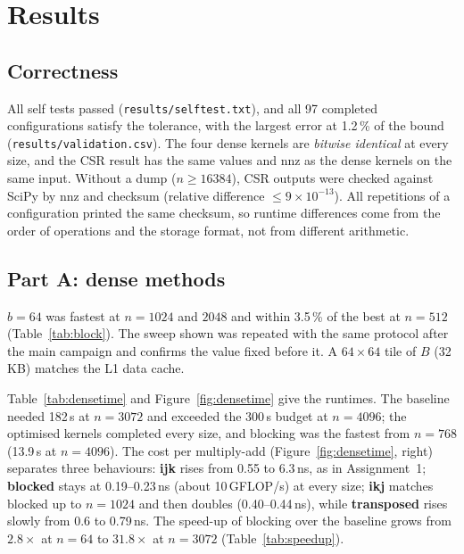 \documentclass[11pt,a4paper]{article}
\newcommand{\concept}[1]{\par\addvspace{8pt}\Needspace{5\baselineskip}%
  \noindent{\color{accent}\bfseries\boldmath #1}\par\nopagebreak\vspace{2pt}}
\begin{document}
\section{Results}

\FloatBarrier
\subsection{Correctness}
All self tests passed (\texttt{results/selftest.txt}), and all 97 completed configurations satisfy
the tolerance, with the largest error at 1.2\,\% of the bound (\texttt{results/validation.csv}).
The four dense kernels are \emph{bitwise identical} at every size, and the CSR result has the same
values and nnz as the dense kernels on the same input. Without a dump ($n\ge16384$), CSR outputs
were checked against SciPy by nnz and checksum (relative difference $\le9\times10^{-13}$). All
repetitions of a configuration printed the same checksum, so runtime differences come from the
order of operations and the storage format, not from different arithmetic.

\FloatBarrier
\subsection{Part A: dense methods}

\concept{Tile size (pre-study)}
$b=64$ was fastest at $n=1024$ and $2048$ and within 3.5\,\% of the best at $n=512$
(Table~\ref{tab:block}). The sweep shown was repeated with the same protocol after the main
campaign and confirms the value fixed before it. A $64\times64$ tile of $B$ (32\,KB) matches the
L1 data cache.

\begin{table}[!htbp]
\centering
\caption{Pre-study: median time of the blocked kernel for each tile size $b$ (5 repetitions;
fastest per row in bold). Raw data: \texttt{results/tuning/block\_sweep.csv}.}
\label{tab:block}
\small\BlockSweepTable
\end{table}

\concept{Runtime}
Table~\ref{tab:densetime} and Figure~\ref{fig:densetime} give the runtimes. The baseline needed
182\,s at $n=3072$ and exceeded the 300\,s budget at $n=4096$; the optimised kernels completed
every size, and blocking was the fastest from $n=768$ (13.9\,s at $n=4096$). The cost per
multiply-add (Figure~\ref{fig:densetime}, right) separates three behaviours: \textbf{ijk} rises
from 0.55 to 6.3\,ns, as in Assignment~1; \textbf{blocked} stays at 0.19--0.23\,ns (about
10\,GFLOP/s) at every size; \textbf{ikj} matches blocked up to $n=1024$ and then doubles
(0.40--0.44\,ns), while \textbf{transposed} rises slowly from 0.6 to 0.79\,ns. The speed-up of
blocking over the baseline grows from $2.8\times$ at $n=64$ to $31.8\times$ at $n=3072$
(Table~\ref{tab:speedup}).
\end{document}
